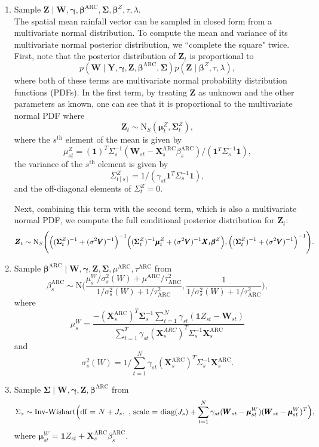 \documentclass[11pt]{article}
\def\bbeta{\pmb{\beta}}
\def\bgamma{\pmb{\gamma}}
\def\bmu{\pmb{\mu}}
\def\bSigma{\pmb{\Sigma}}
\def\bX{\pmb{X}}
\def\bY{\pmb{Y}}
\def\bZ{\pmb{Z}}
\def\bV{\pmb{V}}
\def\bW{\pmb{W}}
\begin{document}
\begin{enumerate}
\item Sample $\bZ \mid \bW, \bgamma, \bbeta^\text{ARC}, \bSigma, \bbeta^Z, \tau, \lambda$. \\
The spatial mean rainfall vector can be sampled in closed form from a multivariate normal distribution. To compute the mean and variance of its multivariate normal posterior distribution, we ``complete the square" twice. First, note that the posterior distribution of $\bZ_t$ is proportional to
$$
p(\bW \mid \bY, \bgamma, \bZ, \bbeta^\text{ARC}, \bSigma) p(\bZ \mid \bbeta^Z, \tau, \lambda),
$$
where both of these terms are multivariate normal probability distribution functions (PDFs). In the first term, by treating $\bZ$ as unknown and the other parameters as known, one can see that it is proportional to the multivariate normal PDF where
$$
\bZ_t \sim \text{N}_S(\bmu^Z_t, \bSigma_t^Z),
$$
where the $s^\text{th}$ element of the mean is given by
$$
\mu^Z_{st} = (\mathbf{1})^T \Sigma_s^{-1}(\bW_{st} - \bX_s^\text{ARC}\beta_s^\text{ARC})/(\mathbf{1}^T \Sigma_s^{-1} \mathbf{1}),
$$
the variance of the $s^\text{th}$ element is given by
$$
\Sigma_{t[s]}^Z = 1/(\gamma_{st}\mathbf{1}^T \Sigma_s^{-1} \mathbf{1}),
$$
and the off-diagonal elements of $\Sigma_t^Z = 0$.

Next, combining this term with the second term, which is also a multivariate normal PDF, we compute the full conditional posterior distribution for $\bZ_t$:
$$
\bZ_t \sim \text{N}_S\Biggl(\Bigl((\bSigma_t^Z)^{-1} + (\sigma^2\bV)^{-1}\Bigr)^{-1}\Bigl((\bSigma_t^Z)^{-1}\bmu_t^Z + (\sigma^2\bV)^{-1}\bX_t\bbeta^Z\Bigr), \Bigl((\bSigma_t^Z)^{-1} + (\sigma^2\bV)^{-1}\Bigr)^{-1}\Biggr).
$$

\item Sample $\bbeta^\text{ARC} \mid \bW, \bgamma, \bZ, \bSigma, \mu^\text{ARC}, \tau^\text{ARC}$ from
$$
\beta_s^\text{ARC} \sim \text{N}\Biggl(\frac{\mu_s^W/\sigma_s^2(W) + \mu^\text{ARC}/\tau_\text{ARC}^2}{1/\sigma_s^2(W) + 1/\tau_\text{ARC}^2}, \frac{1}{1/\sigma_s^2(W) + 1/\tau_\text{ARC}^2}\Biggr),
$$
where
$$
\mu_s^W = \frac{-(\bX_s^\text{ARC})^T \bSigma_s^{-1} \sum_{t = 1}^N \gamma_{st} (\mathbf{1} Z_{st} - \bW_{st})}{\sum_{t=1}^T \gamma_{st}(\bX^{ARC}_s)^T \Sigma_s^{-1} \bX_s^\text{ARC}}
$$
and
$$
\sigma_s^2(W) = 1/\sum_{t=1}^N \gamma_{st}(\bX^\text{ARC}_s)^T \Sigma_s^{-1} \bX_s^\text{ARC}.
$$

\item Sample $\bSigma \mid \bW, \bgamma, \bZ, \bbeta^\text{ARC}$ from \\
$$
\Sigma_s \sim \text{Inv-Wishart}\Bigl(\text{df = }N + J_s, \text{ , scale = diag}(J_s) + \sum_{t=1}^N \gamma_{st}(\bW_{st} - \bmu^W_{st})(\bW_{st} - \bmu^W_{st})^T\Bigr),
$$
where 
$
\bmu^W_{st} = \mathbf{1}Z_{st} + \bX_{s}^\text{ARC}\beta_s^\text{ARC}.
$


\end{enumerate}
\end{document}

